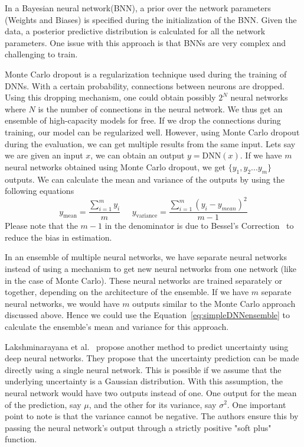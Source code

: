 \documentclass[12pt, twoside, ngerman]{report}
\begin{document}
In a Bayesian neural network(BNN), a prior over the network parameters (Weights and Biases) is specified during the initialization of the BNN.
Given the data,  a posterior predictive distribution is calculated for all the network parameters.
One issue with this approach is that BNNs are very complex and challenging to train. 

Monte Carlo dropout is a regularization technique used during the training of DNNs.
With a certain probability,  connections between neurons are dropped.
Using this dropping mechanism, one could obtain possibly $2^N$ neural networks where $N$ is the number of connections in the neural network.
We thus get an ensemble of high-capacity models for free.
If we drop the connections during training, our model can be regularized well.
However, using Monte Carlo dropout during the evaluation,  we can get multiple results from the same input.
Lets say we are given an input $x$,  we can obtain an output $y = \textrm{DNN}(x)$.  If we have $m$ neural networks obtained using Monte Carlo dropout,  we get $\{y_1, y_2... y_m\}$ outputs.  We can calculate the mean and variance of the outputs by using the following equations
\begin{equation}\label{eq:simpleDNNensemble}
y_\textrm{mean} = \frac{ \sum\limits_{i=1}^{m} y_i}{m}  \;\;\;\;\;  y_\textrm{variance} =\frac{ \sum\limits_{i=1}^{m} (y_i - y_{mean})^2}{m-1}
\end{equation}
Please note that the $m-1$ in the denominator is due to Bessel's Correction~\cite{besselcorrection} to reduce the bias in estimation.

In an ensemble of multiple neural networks, we have separate neural networks instead of using a mechanism to get new neural networks from one network (like in the case of Monte Carlo).
These neural networks are trained separately or together, depending on the architecture of the ensemble.
If we have $m$ separate neural networks, we would have $m$ outputs similar to the Monte Carlo approach discussed above.
Hence we could use the Equation~\ref{eq:simpleDNNensemble} to calculate the ensemble's mean and variance for this approach.

Lakshminarayana et al.~\cite{DeepEnsemblePaper} propose another method to predict uncertainty using deep neural networks.
They propose that the uncertainty prediction can be made directly using a single neural network.
This is possible if we assume that the underlying uncertainty is a Gaussian distribution.
With this assumption, the neural network would have two outputs instead of one. One output for the mean of the prediction, say $\mu$, and the other for its variance,  say $\sigma^2$.
One important point to note is that the variance cannot be negative.
The authors ensure this by passing the neural network's output through a strictly positive "soft plus" function.
\end{document}
